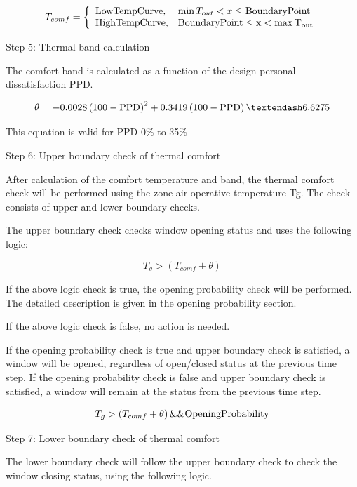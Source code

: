 \begin{equation}
T_{comf} = \left\{ \begin{array}{ll} \rm{Low Temp Curve,} & \min T_{out} < x \leq \rm{Boundary Point} \\ \rm{High Temp Curve,} & \rm{Boundary Point} \leq x < \max T_{out}  \end{array}\right.
\end{equation}

Step 5: Thermal band calculation

The comfort band is calculated as a function of the design personal dissatisfaction PPD.

\begin{equation}
\theta = -0.0028 \left(100-\rm{PPD}\right)^2 + 0.3419 \left(100-\rm{PPD}\right) – 6.6275
\end{equation}

This equation is valid for PPD 0\% to 35\%

Step 6: Upper boundary check of thermal comfort

After calculation of the comfort temperature and band, the thermal comfort check will be performed using the zone air operative temperature Tg. The check consists of upper and lower boundary checks.

The upper boundary check checks window opening status and uses the following logic:

\begin{equation}
T_g > \left(T_{comf} + \theta\right)
\end{equation}

If the above logic check is true, the opening probability check will be performed. The detailed description is given in the opening probability section.

If the above logic check is false, no action is needed.

If the opening probability check is true and upper boundary check is satisfied, a window will be opened, regardless of open/closed status at the previous time step. If the opening probability check is false and upper boundary check is satisfied, a window will remain at the status from the previous time step.

\begin{equation}
T_g > \left(T_{comf} + \theta\right) \&\& \rm{OpeningProbability}
\end{equation}

Step 7: Lower boundary check of thermal comfort

The lower boundary check will follow the upper boundary check to check the window closing status, using the following logic.

